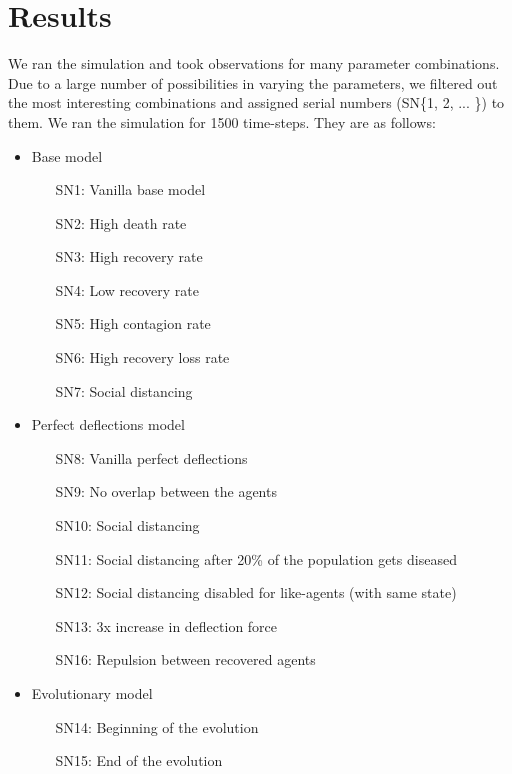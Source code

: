\documentclass[a4paper,11pt]{article}
\begin{document}
    \section{Results}
    We ran the simulation and took observations for many parameter combinations. Due to a large number of possibilities in varying the parameters, we filtered out the most interesting combinations and assigned serial numbers (SN\{1, 2, ... \}) to them. We ran the simulation for 1500 time-steps. They are as follows:

    \begin{itemize}

        \item Base model
        \begin{itemize}
            \item[SN1:] Vanilla base model
            \item[SN2:] High death rate
            \item[SN3:] High recovery rate
            \item[SN4:] Low recovery rate
            \item[SN5:] High contagion rate
            \item[SN6:] High recovery loss rate
            \item[SN7:] Social distancing
        \end{itemize}

        \item Perfect deflections model
        \begin{itemize}
            \item[SN8:] Vanilla perfect deflections
            \item[SN9:] No overlap between the agents
            \item[SN10:] Social distancing
            \item[SN11:] Social distancing after 20\% of the population gets diseased
            \item[SN12:] Social distancing disabled for like-agents (with same state)
            \item[SN13:] 3x increase in deflection force
            \item[SN16:] Repulsion between recovered agents
        \end{itemize}

        \item Evolutionary model
        \begin{itemize}
            \item[SN14:] Beginning of the evolution
            \item[SN15:] End of the evolution
        \end{itemize}

    \end{itemize}
\end{document}
